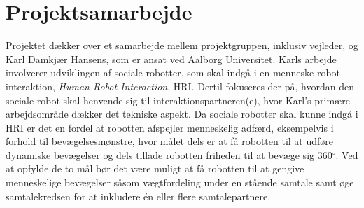 \section{Projektsamarbejde}
\label{ProjektSamarbejde}
%
Projektet dækker over et samarbejde mellem projektgruppen, inklusiv vejleder, og Karl Damkjær Hansens, som er ansat ved Aalborg Universitet. Karls arbejde involverer udviklingen af sociale robotter, som skal indgå i en menneske-robot interaktion, \textit{Human-Robot Interaction}, HRI. Dertil fokuseres der på, hvordan den sociale robot skal henvende sig til interaktionspartneren(e), hvor Karl's primære arbejdsområde dækker det tekniske aspekt. Da sociale robotter skal kunne indgå i HRI er det en fordel at robotten afspejler menneskelig adfærd, eksempelvis i forhold til bevægelsesmønstre, hvor målet dels er at få robotten til at udføre dynamiske bevægelser og dels tillade robotten friheden til at bevæge sig 360$^{\circ}$. Ved at opfylde de to mål bør det være muligt at få robotten til at gengive menneskelige bevægelser såsom vægtfordeling under en stående samtale samt øge samtalekredsen for at inkludere én eller flere samtalepartnere.

